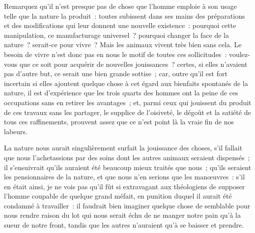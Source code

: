\documentclass[french,twoside]{book} %
\begin{document}
Remarquez qu’il n’est presque pas de chose que l’homme emploie à son usage telle que la nature la produit : toutes subissent dans ses mains des préparations et des modifications qui leur donnent une nouvelle existence : pourquoi cette manipulation, ce manufacturage universel ? pourquoi changer la face de la nature ? serait-ce pour vivre ? Mais les animaux vivent très bien sans cela. Le besoin de vivre n’est donc pas en nous le motif de toutes ces sollicitudes : voulez-vous que ce soit pour acquérir de nouvelles jouissances ? certes, si elles n’avaient pas d’autre but, ce serait une bien grande sottise ; car, outre qu’il est fort incertain si elles ajoutent quelque chose à cet égard aux bienfaits spontanés de la nature, il est d’expérience que les trois quarts des hommes ont la peine de ces occupations sans en retirer les avantages ; et, parmi ceux qui jouissent du produit de ces travaux sans les partager, le supplice de l’oisiveté, le dégoût et la satiété de tous ces raffinements, prouvent assez que ce n’est point là la vraie fin de nos labeurs.\par
La nature nous aurait singulièrement surfait la jouissance des choses, s’il fallait que nous l’achetassions par des soins dont les autres animaux seraient dispensés ; il s’ensuivrait qu’ils auraient été beaucoup mieux traités que nous ; qu’ils seraient les pensionnaires de la nature, et que nous n’en serions que les manœuvres : s’il en était ainsi, je ne vois pas qu’il fût si extravagant aux théologiens de supposer l’homme coupable de quelque grand méfait, en punition duquel il aurait été condamné à travailler : il faudrait bien imaginer quelque chose de semblable pour nous rendre raison du lot qui nous serait échu de ne manger notre pain qu’à la sueur de notre front, tandis que les autres n’auraient qu’à se baisser et prendre.\par
\end{document}
